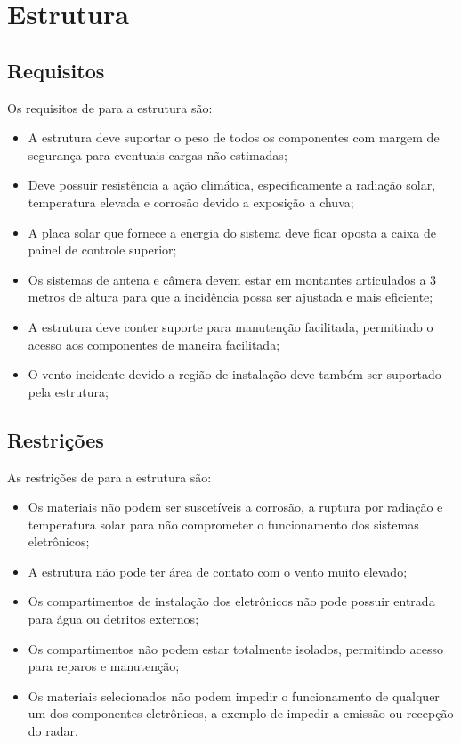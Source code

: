 \chapter{Estrutura}

\section{Requisitos}

Os requisitos de para a estrutura são:


\begin{itemize}
\item A estrutura deve suportar o peso de todos os componentes com margem de segurança para eventuais cargas não estimadas;
\item Deve possuir resistência a ação climática, especificamente a radiação solar, temperatura elevada e corrosão devido a exposição a chuva;
\item A placa solar que fornece a energia do sistema deve ficar oposta a caixa de painel de controle superior;
\item Os sistemas de antena e câmera devem estar em montantes articulados a 3 metros de altura para que a incidência possa ser ajustada e mais eficiente;
\item A estrutura deve conter suporte para manutenção facilitada, permitindo o acesso aos componentes de maneira facilitada;
\item O vento incidente devido a região de instalação deve também ser suportado pela estrutura;
\end{itemize}

\section{Restrições}

As restrições de para a estrutura são:

\begin{itemize}
\item Os materiais não podem ser suscetíveis a corrosão, a ruptura por radiação e temperatura solar para não comprometer o funcionamento dos sistemas eletrônicos;
\item A estrutura não pode ter área de contato com o vento muito elevado;
\item Os compartimentos de instalação dos eletrônicos não pode possuir entrada para água ou detritos externos;
\item Os compartimentos não podem estar totalmente isolados, permitindo acesso para reparos e manutenção;
\item Os materiais selecionados não podem impedir o funcionamento de qualquer um dos componentes eletrônicos, a exemplo de impedir a emissão ou recepção do radar.
\end{itemize}

